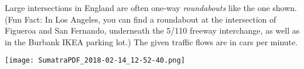 \documentclass[11pt, letterpaper]{exam}
\begin{document}
\begin{questions}
\begin{q}{16}
\end{q}
\vfill

\newpage
\begin{q}{12} %
	Large intersections in England are often one-way \emph{roundabouts} like the one shown. (Fun Fact: In Los Angeles, you can find a roundabout at the intersection of Figueroa and San Fernando, underneath the 5/110 freeway interchange, as well as in the Burbank IKEA parking lot.) The given traffic flows are in cars per minute.
	\texttt{[image: SumatraPDF\_2018-02-14\_12-52-40.png]}
\end{q}

\end{questions}
\end{document}
